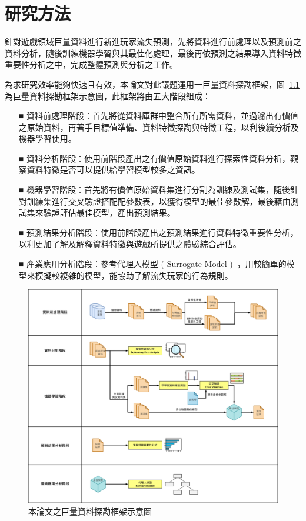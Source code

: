 \chapter{研究方法}
\label{cha:Method}

針對遊戲領域巨量資料進行新進玩家流失預測，先將資料進行前處理以及預測前之資料分析，隨後訓練機器學習與其最佳化處理，最後再依預測之結果導入資料特徵重要性分析之中，完成整體預測與分析之工作。

為求研究效率能夠快速且有效，本論文對此議題運用一巨量資料探勘框架，圖~\ref{fig:Image_Framework} 為巨量資料探勘框架示意圖，此框架將由五大階段組成：

\begin{itemize}
  \item[■] 資料前處理階段：首先將從資料庫群中整合所有所需資料，並過濾出有價值之原始資料，再著手目標值準備、資料特徵探勘與特徵工程，以利後續分析及機器學習使用。
  \item[■] 資料分析階段：使用前階段產出之有價值原始資料進行探索性資料分析，觀察資料特徵是否可以提供給學習模型較多之資訊。
  \item[■] 機器學習階段：首先將有價值原始資料集進行分割為訓練及測試集，隨後針對訓練集進行交叉驗證搭配配參數表，以獲得模型的最佳參數解，最後藉由測試集來驗證評估最佳模型，產出預測結果。
  \item[■] 預測結果分析階段：使用前階段產出之預測結果進行資料特徵重要性分析，以利更加了解及解釋資料特徵與遊戲所提供之體驗綜合評估。
  \item[■] 產業應用分析階段：參考代理人模型 ( Surrogate Model )~\cite{wiki:SurrogateModel}，用較簡單的模型來模擬較複雜的模型，能協助了解流失玩家的行為規則。
\end{itemize} 

\begin{figure}[!htb]
  \begin{center}
    \includegraphics[width=1\textwidth]{figures/Image_Framework.png}
    \caption[本論文之巨量資料探勘框架示意圖]{本論文之巨量資料探勘框架示意圖}
    \label{fig:Image_Framework}
  \end{center}
\end{figure}
\newpage

